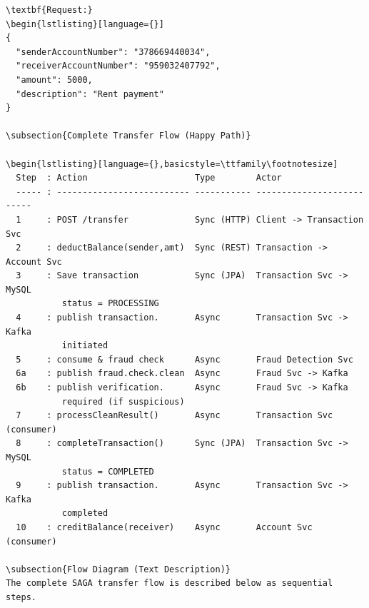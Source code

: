 \documentclass[12pt,a4paper]{article}
\begin{document}
\begin{lstlisting}[language={}]
\textbf{Request:}
\begin{lstlisting}[language={}]
{
  "senderAccountNumber": "378669440034",
  "receiverAccountNumber": "959032407792",
  "amount": 5000,
  "description": "Rent payment"
}

\subsection{Complete Transfer Flow (Happy Path)}

\begin{lstlisting}[language={},basicstyle=\ttfamily\footnotesize]
  Step  : Action                     Type        Actor
  ----- : -------------------------- ----------- --------------------------
  1     : POST /transfer             Sync (HTTP) Client -> Transaction Svc
  2     : deductBalance(sender,amt)  Sync (REST) Transaction -> Account Svc
  3     : Save transaction           Sync (JPA)  Transaction Svc -> MySQL
           status = PROCESSING
  4     : publish transaction.       Async       Transaction Svc -> Kafka
           initiated
  5     : consume & fraud check      Async       Fraud Detection Svc
  6a    : publish fraud.check.clean  Async       Fraud Svc -> Kafka
  6b    : publish verification.      Async       Fraud Svc -> Kafka
           required (if suspicious)
  7     : processCleanResult()       Async       Transaction Svc (consumer)
  8     : completeTransaction()      Sync (JPA)  Transaction Svc -> MySQL
           status = COMPLETED
  9     : publish transaction.       Async       Transaction Svc -> Kafka
           completed
  10    : creditBalance(receiver)    Async       Account Svc (consumer)

\subsection{Flow Diagram (Text Description)}
The complete SAGA transfer flow is described below as sequential steps.


\end{lstlisting}
\end{document}
